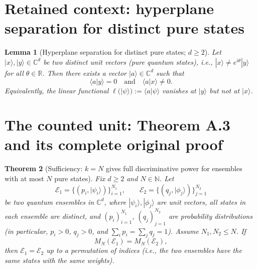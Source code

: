 \documentclass[10pt,a4paper]{amsart}
\providecommand{\ket}[1]{|#1 \rangle}
\providecommand{\braket}[2]{\langle #1|#2 \rangle}
\theoremstyle{plain}
\newtheorem{theorem}{Theorem}
\newtheorem{lemma}[theorem]{Lemma}
\theoremstyle{definition}
\theoremstyle{remark}
\begin{document}
\section*{Retained context: hyperplane separation for distinct pure states}

\begin{lemma}[Hyperplane separation for distinct pure states; $d\ge 2$]
Let $\ket{x},\ket{y}\in\mathbb C^d$ be two distinct unit vectors (pure quantum states), i.e.,
$\ket{x}\neq e^{i\theta}\ket{y}$ for all $\theta\in\mathbb R$. Then there exists a vector $\ket{a}\in\mathbb C^d$
such that
\begin{equation}
\braket{a}{y}=0
\quad\text{and}\quad
\braket{a}{x}\neq 0.
\label{eq:app-hyperplane-separation}
\end{equation}
Equivalently, the linear functional $\ell(\ket{\psi}) := \braket{a}{\psi}$ vanishes at $\ket{y}$ but not at $\ket{x}$. \label{lemma: hyperplane}
\end{lemma}


\section{The counted unit: Theorem A.3 and its complete original proof}

\begin{theorem}[Sufficiency: $k=N$ gives full discriminative power for ensembles with at most $N$ pure states]
Fix $d\ge 2$ and $N\in\mathbb N$.
Let
\[
\mathcal E_1=\{(p_i,\ket{\psi_i})\}_{i=1}^{N_1},
\qquad
\mathcal E_2=\{(q_j,\ket{\phi_j})\}_{j=1}^{N_2}
\]
be two quantum ensembles in $\mathbb C^d$, where $\ket{\psi_i},\ket{\phi_j}$ are unit vectors, all states in each
ensemble are distinct, and $(p_i)_{i=1}^{N_1}$, $(q_j)_{j=1}^{N_2}$ are probability distributions (in particular,
$p_i>0$, $q_j>0$, and $\sum_i p_i=\sum_j q_j=1$). Assume $N_1,N_2\le N$.
If
\[
M_N(\mathcal E_1)=M_N(\mathcal E_2),
\]
then $\mathcal E_1=\mathcal E_2$ up to a permutation of indices (i.e., the two ensembles have the same states with
the same weights).\label{thm: k=N full discriminative power}
\end{theorem}
\end{document}
